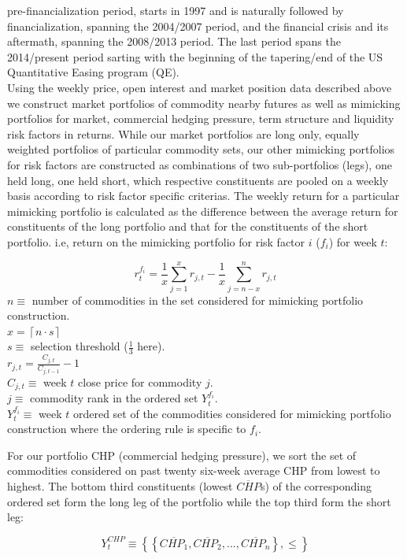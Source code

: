 \documentclass[12pt,]{article}
\begin{document}
pre-financialization period, starts in 1997 and is naturally followed by
financialization, spanning the 2004/2007 period, and the financial
crisis and its aftermath, spanning the 2008/2013 period. The last period
spans the 2014/present period sarting with the beginning of the
tapering/end of the US Quantitative Easing program (QE).\\
Using the weekly price, open interest and market position data described
above we construct market portfolios of commodity nearby futures as well
as mimicking portfolios for market, commercial hedging pressure, term
structure and liquidity risk factors in returns. While our market
portfolios are long only, equally weighted portfolios of particular
commodity sets, our other mimicking portfolios for risk factors are
constructed as combinations of two sub-portfolios (legs), one held long,
one held short, which respective constituents are pooled on a weekly
basis according to risk factor specific criterias. The weekly return for
a particular mimicking portfolio is calculated as the difference between
the average return for constituents of the long portfolio and that for
the constituents of the short portfolio. i.e, return on the mimicking
portfolio for risk factor \(i\) (\(f_{i}\)) for week \(t\):

\[r_{t}^{f_{i}}=\frac{1}{x}\sum_{j=1}^{x}r_{j,t}-\frac{1}{x}\sum_{j=n-x}^{n}r_{j,t}\]
\(n\equiv\) number of commodities in the set considered for mimicking
portfolio construction.\\
\(x = \left \lceil n \cdot s \right \rceil\)\\
\(s\equiv\) selection threshold (\(\frac{1}{3}\) here).\\
\(r_{j,t}=\frac{C_{j,t}}{C_{j,t-1}}-1\)\\
\(C_{j,t}\equiv\) week \(t\) close price for commodity \(j\).\\
\(j\equiv\) commodity rank in the ordered set \(Y_{t}^{f_{i}}\).\\
\(Y_{t}^{f_{i}}\equiv\) week \(t\) ordered set of the commodities
considered for mimicking portfolio construction where the ordering rule
is specific to \(f_{i}\).

For our portfolio CHP (commercial hedging pressure), we sort the set of
commodities considered on past twenty six-week average CHP from lowest
to highest. The bottom third constituents (lowest \(\overline{CHP}\)s)
of the corresponding ordered set form the long leg of the portfolio
while the top third form the short leg:

\[Y_{t}^{CHP}\equiv\left \{ \left \{ \overline{CHP_{1}}, \overline{CHP_{2}}, ..., \overline{CHP_{n}} \right \}, \leq \right \}\]
\end{document}
